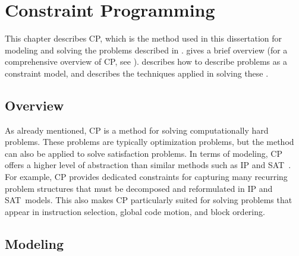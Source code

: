 %

\chapter{Constraint Programming}

This chapter describes \glsdesc{CP}, which is the method used in this
dissertation for modeling and solving the problems described in
.
%
 gives a brief overview (for a comprehensive overview of
\gls{CP}, see \cite{RossiEtAl:2006}).
%
 describes how to describe problems as a \gls{constraint
  model}, and  describes the techniques applied in
solving these .



\section{Overview}

As already mentioned, \glsdesc{CP} is a method for solving computationally hard
problems.
%
These problems are typically optimization problems, but the method can also be
applied to solve satisfaction problems.
%
In terms of modeling, \gls{CP} offers a higher level of abstraction than similar
methods such as \gls{IP} and \gls{SAT}~\cite{BiereEtAl:2009}.
%
For example, \gls{CP} provides dedicated constraints for capturing many
recurring problem structures that must be decomposed and reformulated in
\gls{IP} and \gls{SAT}~models.
%
This also makes \gls{CP} particularly suited for solving problems that appear in
\gls{instruction selection}, \gls{global code motion}, and \gls{block ordering}.



\section{Modeling}

